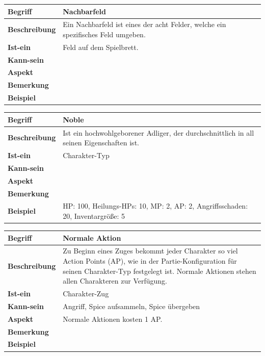 \documentclass[12pt]{article}
\begin{document}
\begin{tabularx}{\linewidth}{|l|X|}
\hline
\textbf{Begriff} & \textbf{Nachbarfeld } \\
\hline
\textbf{Beschreibung} & Ein Nachbarfeld ist eines der acht Felder, welche ein spezifisches Feld umgeben. \\
\hline
\textbf{Ist-ein} & Feld auf dem Spielbrett. \\
\hline
\textbf{Kann-sein} & \\
\hline
\textbf{Aspekt} &  \\
\hline
\textbf{Bemerkung} & \\
\hline
\textbf{Beispiel} & \\
\hline
\end{tabularx}

\begin{tabularx}{\linewidth}{|l|X|}
\hline
\textbf{Begriff} & \textbf{Noble} \\
\hline
\textbf{Beschreibung} & Ist ein hochwohlgeborener Adliger, der durchschnittlich in all seinen Eigenschaften ist.\\
\hline
\textbf{Ist-ein} & Charakter-Typ\\
\hline
\textbf{Kann-sein} & \\
\hline
\textbf{Aspekt} & \\
\hline
\textbf{Bemerkung} &  \\
\hline
\textbf{Beispiel} & HP: 100, Heilungs-HPs: 10, MP: 2, AP: 2, Angriffsschaden: 20, Inventargröße: 5 \\
\hline
\end{tabularx}

\begin{tabularx}{\linewidth}{|l|X|}
\hline
\textbf{Begriff} & \textbf{Normale Aktion} \\
\hline
\textbf{Beschreibung} & Zu Beginn eines Zuges bekommt jeder Charakter so viel Action Points (AP), wie in der Partie-Konfiguration für seinen Charakter-Typ festgelegt ist. Normale Aktionen stehen allen Charakteren zur Verfügung.\\
\hline
\textbf{Ist-ein} & Charakter-Zug\\
\hline
\textbf{Kann-sein} & Angriff, Spice aufsammeln, Spice übergeben\\
\hline
\textbf{Aspekt} & Normale Aktionen kosten 1 AP.\\
\hline
\textbf{Bemerkung} &  \\
\hline
\textbf{Beispiel} &  \\
\hline
\end{tabularx}
\end{document}
